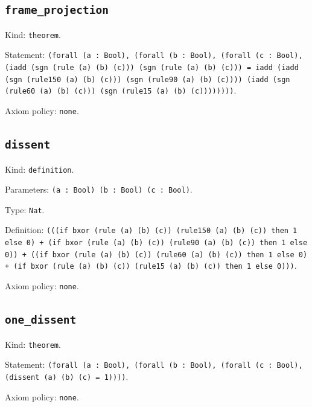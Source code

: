 \documentclass[11pt]{article}
\begin{document}
\subsection*{\texttt{frame\_projection}}
\noindent Kind: \texttt{theorem}.\par
\noindent Statement: \texttt{(forall (a : Bool), (forall (b : Bool), (forall (c : Bool), (iadd (sgn (rule (a) (b) (c))) (sgn (rule (a) (b) (c))) = iadd (iadd (sgn (rule150 (a) (b) (c))) (sgn (rule90 (a) (b) (c)))) (iadd (sgn (rule60 (a) (b) (c))) (sgn (rule15 (a) (b) (c))))))))}.\par
\noindent Axiom policy: \texttt{none}.\par
\subsection*{\texttt{dissent}}
\noindent Kind: \texttt{definition}.\par
\noindent Parameters: \texttt{(a : Bool) (b : Bool) (c : Bool)}.\par
\noindent Type: \texttt{Nat}.\par
\noindent Definition: \texttt{(((if bxor (rule (a) (b) (c)) (rule150 (a) (b) (c)) then 1 else 0) + (if bxor (rule (a) (b) (c)) (rule90 (a) (b) (c)) then 1 else 0)) + ((if bxor (rule (a) (b) (c)) (rule60 (a) (b) (c)) then 1 else 0) + (if bxor (rule (a) (b) (c)) (rule15 (a) (b) (c)) then 1 else 0)))}.\par
\noindent Axiom policy: \texttt{none}.\par
\subsection*{\texttt{one\_dissent}}
\noindent Kind: \texttt{theorem}.\par
\noindent Statement: \texttt{(forall (a : Bool), (forall (b : Bool), (forall (c : Bool), (dissent (a) (b) (c) = 1))))}.\par
\noindent Axiom policy: \texttt{none}.\par
\end{document}
